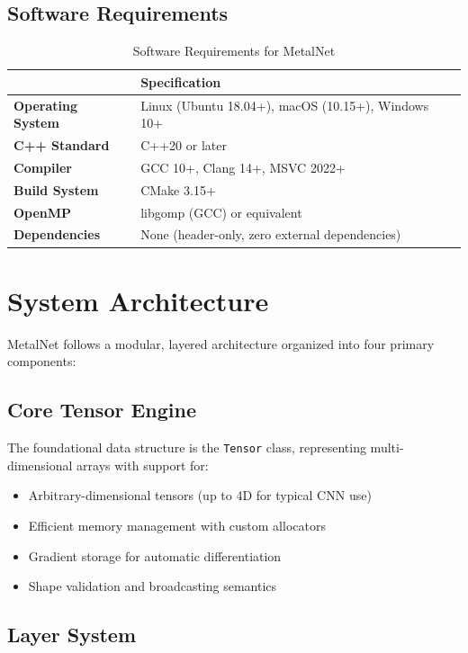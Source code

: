 \documentclass[12pt,oneside,a4paper]{report}
\newcommand{\hdr}{\rowcolor{mnHeaderBg}}
\newcommand{\hcell}[1]{{\bfseries\color{white}#1}}
\newcommand{\zebra}{\rowcolors{2}{mnRowA}{mnRowB}}
\newenvironment{ptable}[2]{%
  \begin{table}[H]\centering
  \caption{#1}%
  \vspace{2pt}%
  \zebra
  \setlength{\arrayrulewidth}{0.5pt}%
  \begin{tabular}{#2}\toprule}%
  {\bottomrule\end{tabular}\end{table}}
\begin{document}
\subsection{Software Requirements}

\begin{ptable}{Software Requirements for MetalNet}{>{\bfseries\color{mnPrimary}}l l}
\hdr \hcell{Component} & \hcell{Specification} \\ \midrule
Operating System & Linux (Ubuntu 18.04+), macOS (10.15+), Windows 10+ \\
C++ Standard     & C++20 or later \\
Compiler         & GCC 10+, Clang 14+, MSVC 2022+ \\
Build System     & CMake 3.15+ \\
OpenMP           & libgomp (GCC) or equivalent \\
Dependencies     & None (header-only, zero external dependencies) \\
\end{ptable}

\section{System Architecture}

MetalNet follows a modular, layered architecture organized into four primary components:

\subsection{Core Tensor Engine}

The foundational data structure is the \texttt{Tensor} class, representing multi-dimensional arrays with support for:
\begin{itemize}
    \item Arbitrary-dimensional tensors (up to 4D for typical CNN use)
    \item Efficient memory management with custom allocators
    \item Gradient storage for automatic differentiation
    \item Shape validation and broadcasting semantics
\end{itemize}

\subsection{Layer System}
\end{document}
